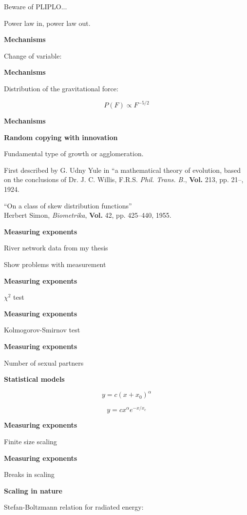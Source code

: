   Beware of PLIPLO...

  Power law in, power law out.


  \textbf{Mechanisms}

  Change of variable:


  \textbf{Mechanisms}

  Distribution of the gravitational force:

  $$ P(F) \propto F^{-5/2} $$



  \textbf{Mechanisms}

  \textbf{Random copying with innovation}

  Fundamental type of growth or agglomeration.

  First described by G. Udny Yule in 
  ``a mathematical theory of evolution, based on the 
  conclusions of Dr. J. C. Willis, F.R.S.
  \textit{Phil. Trans. B.}, \textbf{Vol.} 213, pp. 21--, 1924.

  ``On a class of skew distribution functions''\\
  Herbert Simon, \textit{Biometrika}, \textbf{Vol.} 42, pp. 425--440, 1955.


  \textbf{Measuring exponents}

  River network data from my thesis

  Show problems with measurement




  \textbf{Measuring exponents}

  $\chi^2$ test


  \textbf{Measuring exponents}

  Kolmogorov-Smirnov test



  \textbf{Measuring exponents}

  Number of sexual partners



  \textbf{Statistical models}

  $$y = c (x + x_0)^\alpha$$

  $$y = c x^\alpha e^{-x/x_c}$$


  \textbf{Measuring exponents}

  Finite size scaling


  \textbf{Measuring exponents}

  Breaks in scaling



  \textbf{Scaling in nature}

  Stefan-Boltzmann relation for radiated energy:

